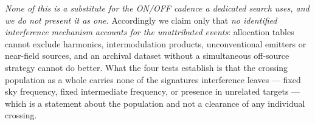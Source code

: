 \emph{None of this is a substitute for the ON/OFF cadence a dedicated search
uses, and we do not present it as one.} Accordingly we claim only that
\emph{no identified interference mechanism accounts for the unattributed
events}:
allocation tables cannot exclude harmonics, intermodulation products,
unconventional emitters or near-field sources, and an archival dataset
without a simultaneous off-source strategy cannot do better. What the four
tests establish is that the crossing population as a whole carries none of
the signatures interference leaves --- fixed sky frequency, fixed
intermediate frequency, or presence in unrelated targets --- which is a
statement about the population and not a clearance of any individual
crossing.

